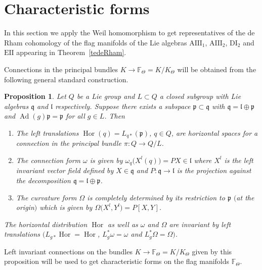 \documentclass[pdftex]{sigma}
\numberwithin{equation}{section}
\newtheorem{Proposition}[Theorem]{Proposition}
 { \theoremstyle{definition}
\newtheorem{Definition}[Theorem]{Definition}
\newtheorem{Note}[Theorem]{Note}
\newtheorem{Example}[Theorem]{Example}
\newtheorem{Remark}[Theorem]{Remark} }
\begin{document}
\section{Characteristic forms}\label{secCharacClass}

In this section we apply the Weil homomorphism to get representatives of the de Rham cohomo\-lo\-gy of the flag manifolds of the Lie algebras $\mathrm{AIII}_{1}$, $\mathrm{AIII}_{2}$, $\mathrm{DI}_{2}$ and $\mathrm{EII}$ appearing in Theorem~\ref{tedeRham}.

Connections in the principal bundles $K\rightarrow \mathbb{F}_{\Theta}=K/K_{\Theta }$ will be obtained from the following general standard construction.

\begin{Proposition}Let $Q$ be a Lie group and $L\subset Q$ a closed subgroup with Lie algebras $\mathfrak{q}$ and $\mathfrak{l}$ respectively. Suppose there exists a subspace $\mathfrak{p}\subset \mathfrak{q}$ with $\mathfrak{q}=\mathfrak{l}\oplus \mathfrak{p}$ and $\operatorname{Ad}(g) \mathfrak{p}=\mathfrak{p}$ for all $g\in L$. Then
\begin{enumerate}\itemsep=0pt
\item[$1.$] The left translations $\operatorname{Hor}(q) =L_{q\ast } ( \mathfrak{p}) $, $q\in Q$, are horizontal spaces for a connection in the principal bundle $\pi\colon Q\rightarrow Q/L$.

\item[$2.$] The connection form $\omega $ is given by $\omega _{q}\big(X^{l}(q) \big) =PX\in \mathfrak{l}$ where $X^{l}$ is the left invariant vector field defined by $X\in \mathfrak{q}$ and $P\colon \mathfrak{q}\rightarrow \mathfrak{l}$ is the projection against the decomposition $\mathfrak{q}=\mathfrak{l}\oplus \mathfrak{p}$.

\item[$3.$] The curvature form $\Omega $ is completely determined by its restriction to $\mathfrak{p}$ $($at the origin$)$ which is given by $\Omega \big( X^{l},Y^{l}\big) =P [ X,Y ] $.
\end{enumerate}

The horizontal distribution $\operatorname{Hor}$ as well as $\omega $ and $\Omega $ are invariant by left translations $(L_{g\ast }\operatorname{Hor} \allowbreak=\operatorname{Hor}$, $L_{g}^{\ast }\omega =\omega $ and $L_{g}^{\ast }\Omega =\Omega )$.
\end{Proposition}

Left invariant connections on the bundles $K\rightarrow \mathbb{F}_{\Theta }=K/K_{\Theta }$ given by this proposition will be used to get characteristic forms on the flag manifolds $\mathbb{F}_{\Theta }$.
\end{document}
